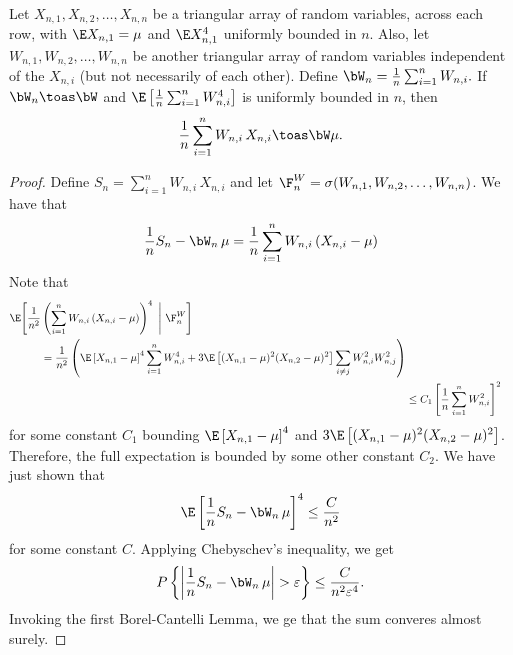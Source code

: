 \begin{proposition}\label{P:weighted-slln}
    Let $X_{n,1}, X_{n,2}, \ldots, X_{n,n}$ be a triangular array of random
    variables, \iid across each row, with $\E X_{n,1} = \mu$ and 
    $\E X_{n,1}^4$  uniformly bounded in $n$.
    Also, let $W_{n,1}, W_{n,2}, \ldots, 
    W_{n,n}$ be another triangular array of random variables independent of 
    the $X_{n,i}$ (but not necessarily of each other).  Define 
    \(
        \bW_n = \frac{1}{n} \sum_{i=1}^n W_{n,i}.
    \) 
    If $\bW_n \toas \bW$ and 
    $\E \left[ \frac{1}{n} \sum_{i=1}^n W_{n,i}^4 \right]$ is uniformly 
    bounded in $n$, then
    \[
        \frac{1}{n} \sum_{i=1}^n W_{n,i} \, X_{n,i} \toas \bW \mu.
    \]
\end{proposition}
\begin{proof}
    Define $S_n = \sum_{i=1}^n W_{n,i} \, X_{n,i}$ and let
    $\F^W_n = \sigma( W_{n,1}, W_{n,2}, \ldots, W_{n,n})$.  We have that
    \[
        \frac{1}{n} S_n - \bW_n \, \mu
        = 
       \frac{1}{n}
       \sum_{i=1}^n
           W_{n,i} \,
           (X_{n,i} - \mu) 
    \]
    Note that
    \begin{align*}
        \begin{split}
        \E \Bigg[
            \frac{1}{n^2}
            &\left(
                \sum_{i=1}^n
                    W_{n,i} \,
                    (X_{n,i} - \mu) 
            \right)^4
        \,\, \Bigg| \,\,
            \F^W_n
        \Bigg] \\
        &= \frac{1}{n^2} \left(
               \E \left[ X_{n,1} - \mu \right]^4
               \sum_{i=1}^n
                   W_{n,i}^4
               +
               3 \E \left[
                   (X_{n,1} - \mu)^2 (X_{n,2} - \mu)^2
               \right]
               \sum_{i \neq j}
                   W_{n,i}^2 W_{n,j}^2
           \right)
        \end{split} \\
        &\leq C_1 \left[
            \frac{1}{n}
            \sum_{i=1}^n W_{n,i}^2
        \right]^2
    \end{align*}
    for some constant $C_1$ bounding $\E \left[ X_{n,1} - \mu \right]^4$
    and $3 \E \left[ (X_{n,1} - \mu)^2 (X_{n,2} - \mu)^2 \right]$.
    Therefore, the full expectation is bounded by some other constant $C_2$.  
    We have just shown that
    \[
        \E \left[ 
            \frac{1}{n} S_n - \bW_n \, \mu
           \right]^4
        \leq \frac{C}{n^2}
    \]
    for some constant $C$.  Applying Chebyschev's inequality, we get
    \[
        P \left\{
            \left|
                \frac{1}{n} S_n - \bW_n \, \mu
            \right|
            > \varepsilon
        \right\}
        \leq \frac{C}{n^2 \varepsilon^4}.
    \]
    Invoking the first Borel-Cantelli Lemma, we ge that the sum converes
    almost surely.
\end{proof}

